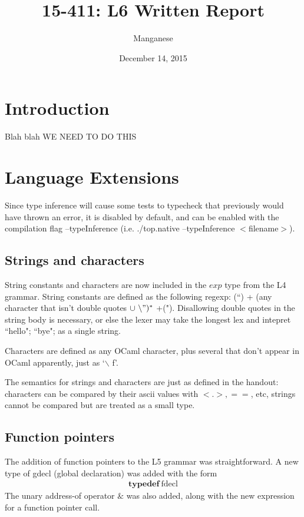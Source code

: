 \documentclass{article}
\title{15-411: L6 Written Report}
\author{Manganese}
\date{December 14, 2015}
\begin{document}
\maketitle

\section{Introduction}

Blah blah WE NEED TO DO THIS\\
\section{Language Extensions}

Since type inference will cause some tests to typecheck that previously would have thrown an error, it is disabled by default, and can be enabled with the compilation flag --typeInference (i.e. ./top.native --typeInference $<$filename$>$).\\

\subsection{Strings and characters}
String constants and characters are now included in the $exp$ type from the L4 grammar. String constants are defined as the following regexp: (``) + (any character that isn't double quotes $\cup \  \backslash")^*$ +("). Disallowing double quotes in the string body is necessary, or else the lexer may take the longest lex and intepret ``hello"; ``bye"; as a single string.

Characters are defined as any OCaml character, plus several that don't appear in OCaml apparently, just as `$\backslash$ f'.

The semantics for strings and characters are just as defined in the handout: characters can be compared by their ascii values with $<. >, ==$, etc, strings cannot be compared but are treated as a small type.

\subsection{Function pointers}
The addition of function pointers to the L5 grammar was straightforward. A new type of gdecl (global declaration) was added with the form \begin{align*}
\textbf{typedef} \ \textrm{fdecl}
\end{align*}
The unary address-of operator $\&$ was also added, along with the new expression for a function pointer call.
\end{document}
